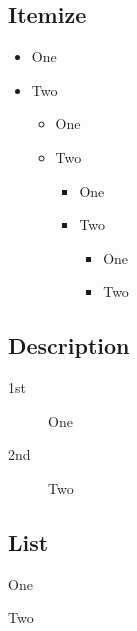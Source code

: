 \documentclass{article}
\newenvironment{myitemize}{%
    \begin{list}{\textbullet}{%
        \setlength\topsep{0pt} \setlength\partopsep{0pt}
        \setlength\parsep{0pt} \setlength\itemsep{0pt}
    }}
    {\end{list}}
\begin{document}
        \subsection{Itemize}
            \begin{itemize}
                \item One \textbullet
                \item Two \textbullet
                \begin{itemize}
                    \item One {\normalfont\bfseries \textendash}
                    \item Two {\normalfont\bfseries \textendash}
                    \begin{itemize}
                        \item One \textasteriskcentered
                        \item Two \textasteriskcentered
                        \begin{itemize}
                            \item One \textperiodcentered
                            \item Two \textperiodcentered
                        \end{itemize}
                    \end{itemize}
                \end{itemize}
            \end{itemize}
             
        \subsection{Description}
            \renewcommand\descriptionlabel[1]{\normalfont\Large\itshape\textbullet #1}
            \begin{description}
                \item[1st] One
                \item[2nd] Two  
            \end{description}
        \subsection{List}
            
            \begin{myitemize}
                \item One
                \item Two
            \end{myitemize}
\end{document}
